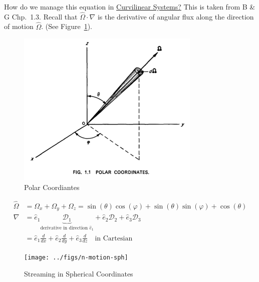 \documentclass[12pt]{article}
\newcommand{\vOmega}{\ensuremath{\hat{\Omega}}}
\begin{document}
How do we manage this equation in \underline{Curvilinear Systems?}
 This is taken from B \& G Chp.\ 1.3.
Recall that $\vOmega \cdot \nabla$ is the derivative of angular flux along the direction of motion $\vOmega$. (See Figure~\ref{fig:cart-coord}).
%
\begin{figure}[h!]
    \begin{center}
    \includegraphics[keepaspectratio, width = 3.75 in]{../figs/polar-coords}
    \end{center}   
    \caption{Polar Coordiantes}
    \label{fig:cart-coord}
\end{figure}
%
\begin{align*}
\vOmega &= \Omega_x + \Omega_y + \Omega_z =  \sin(\theta)\cos(\varphi) + \sin(\theta)\sin(\varphi) + \cos(\theta)\\
\nabla &= \hat{e}_1 \underbrace{\mathcal{D}_1}_{\text{derivative in direction }\hat{e}_1} + \hat{e}_2 \mathcal{D}_2 + \hat{e}_3 \mathcal{D}_3\\
&= \hat{e}_1 \frac{d}{dx} + \hat{e}_2 \frac{d}{dy} + \hat{e}_3 \frac{d}{dz} \quad \text{in Cartesian}
\end{align*}

\begin{figure}[h!]
    \begin{center}
    \texttt{[image: ../figs/n-motion-sph]}
    \end{center}    
    \caption{Streaming in Spherical Coordinates}
    \label{fig:sph-m} 
\end{figure}
\end{document}
